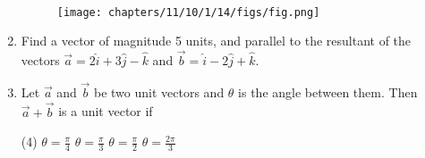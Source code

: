 \begin{enumerate}[label=\thesection.\arabic*,ref=\thesection.\theenumi]
\\
\begin{figure}[ht]
\centering
\texttt{[image: chapters/11/10/1/14/figs/fig.png]}
\caption{}
\label{fig:chapters/11/10/1/14/1}
\end{figure}
\solution

\item Find a vector of magnitude 5 units, and parallel to the resultant of the vectors $\vec{a}=2\hat{i}+3\hat{j}-\hat{k}$ and $\vec{b}=\hat{i}-2\hat{j}+\hat{k}$.\\

\item Let $\vec{a}$ and $\vec{b}$ be two unit vectors and $\theta$ is the angle between them. Then $\vec{a}+\vec{b}$ is a unit vector if
		\begin{tasks}(4)
			\task $\theta = \frac{\pi}{4}$
			\task $\theta = \frac{\pi}{3}$
			\task $\theta = \frac{\pi}{2}$
			\task $\theta = \frac{2\pi}{3}$
			\end{tasks}
\solution

\end{enumerate}
